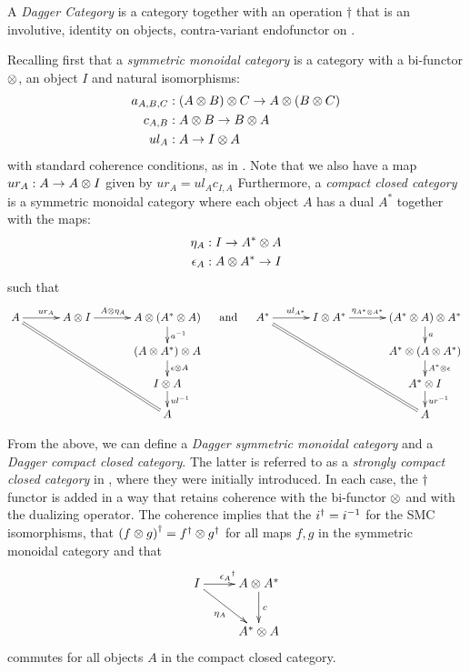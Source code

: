 \begin{definition}
  A \emph{Dagger Category}\cite{selinger05:dagger} is a category \C together with an operation
  $\dagger$ that is an involutive, identity on objects, contra-variant endofunctor on \C.
\end{definition}
Recalling first that a \emph{symmetric monoidal category} is a category \B with a bi-functor $\otimes$,
an object $I$ and natural isomorphisms:
\begin{align*}
  a_{A,B,C}&: (A\otimes B)\otimes C \to A\otimes (B\otimes C)\\
  c_{A,B} &:A\otimes B \to B\otimes A\\
  ul_A &:A \to I \otimes A
\end{align*}
with standard coherence conditions, as in \cite{maclan97:categorieswrkmath}. Note that we
also have a map $ur_A: A \to A\otimes I$ given by $ur_A = ul_A c_{I,A}$ Furthermore, a \emph{compact
closed category} \C is a symmetric monoidal category where each object $A$ has a dual $A^{*}$
together with the maps:
\begin{align*}
  \eta_A:I \to {A}^{*} \otimes A\\
  \epsilon_A : A\otimes{A}^{*} \to I
\end{align*}
such that
\[
  \xymatrix@C+8pt@R-10pt{
    A \ar[r]^{ur_A} \ar@{=}[dddrr]
      & A\* I \ar[r]^(.4){A\*\eta_A}
      & A\* (\dual{A}\*A) \ar[d]^{a^{-1}}\\
    & & (A\*\dual{A})\*A \ar[d]^{\epsilon\*A}\\
    & & I\* A \ar[d]^{ul^{-1}}\\
    & & A
  }
  \quad\text{ and  }\quad
  \xymatrix@C+8pt@R-10pt{
    \dual{A} \ar[r]^{ul_{\dual{A}}} \ar@{=}[dddrr]
      & I\*\dual{A} \ar[r]^(.4){\eta_{\dual{A}\*\dual{A}}}
      & (\dual{A}\*A)\*\dual{A} \ar[d]^{a}\\
    & & \dual{A}\*(A\*\dual{A}) \ar[d]^{\dual{A}\*\epsilon}\\
    & & \dual{A}\*I \ar[d]^{ur^{-1}}\\
    & & A
  }
\]

From the above, we can define a \emph{Dagger symmetric monoidal category} and a \emph{Dagger
compact closed category}. The latter is referred to as a \emph{strongly compact closed category} in
\cite{abramsky02:traces}, where they were initially introduced. In each case, the $\dagger$ functor
is added in a way that retains coherence with the bi-functor $\otimes$ and with the dualizing operator.
The coherence implies that the ${i}^{\dagger} = i^{-1}$ for the SMC isomorphisms, that ${(f\otimes g)}^{\dagger} =
{f}^{\dagger}\otimes{g}^{\dagger}$ for all maps $f,g$ in the symmetric monoidal category and that
\[
  \xymatrix{
    I \ar[dr]_{\eta_A} \ar[r]^{\dgr{\epsilon_A}} & A\* \dual{A} \ar[d]^{c} \\
    &\dual{A}\*A 
  }
\]
commutes for all objects $A$ in the compact closed category.


